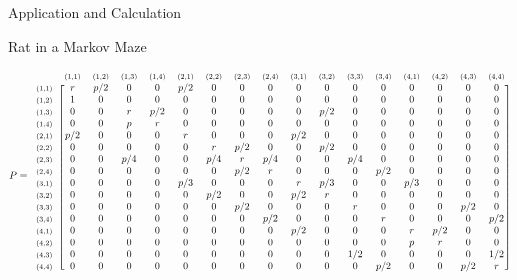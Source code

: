 \documentclass[12pt]{article}
\newcommand{\matindex}[1]{\mbox{\scriptsize#1}}
\newcommand\scalemath[2]{\scalebox{#1}{\mbox{\ensuremath{\displaystyle #2}}}}
\numberwithin{equation}{section}
\begin{document}
\begin{section}{Application and Calculation}
\begin{subsection}{Rat in a Markov Maze}
\begin{enumerate}
            \[\scalemath{0.75}{P=\begin{blockarray}{ccccccccccccccccc}&\matindex{(1,1)}&\matindex{(1,2)}&\matindex{(1,3)}&\matindex{(1,4)}&\matindex{(2,1)}&\matindex{(2,2)}&\matindex{(2,3)}&\matindex{(2,4)}&\matindex{(3,1)}&\matindex{(3,2)}&\matindex{(3,3)}&\matindex{(3,4)}&\matindex{(4,1)}&\matindex{(4,2)}&\matindex{(4,3)}&\matindex{(4,4)}\\
        \begin{block}{c[cccccccccccccccc]}\matindex{(1,1)}&r&p/2&0&0&p/2&0&0&0&0&0&0&0&0&0&0&0\\
        \matindex{(1,2)}&1&0&0&0&0&0&0&0&0&0&0&0&0&0&0&0\\
        \matindex{(1,3)}&0&0&r&p/2&0&0&0&0&0&p/2&0&0&0&0&0&0\\
        \matindex{(1,4)}&0&0&p&r&0&0&0&0&0&0&0&0&0&0&0&0\\
        \matindex{(2,1)}&p/2&0&0&0&r&0&0&0&p/2&0&0&0&0&0&0&0\\
        \matindex{(2,2)}&0&0&0&0&0&r&p/2&0&0&p/2&0&0&0&0&0&0\\
        \matindex{(2,3)}&0&0&p/4&0&0&p/4&r&p/4&0&0&p/4&0&0&0&0&0\\
        \matindex{(2,4)}&0&0&0&0&0&0&p/2&r&0&0&0&p/2&0&0&0&0\\
        \matindex{(3,1)}&0&0&0&0&p/3&0&0&0&r&p/3&0&0&p/3&0&0&0\\
        \matindex{(3,2)}&0&0&0&0&0&p/2&0&0&p/2&r&0&0&0&0&0&0\\
        \matindex{(3,3)}&0&0&0&0&0&0&p/2&0&0&0&r&0&0&0&p/2&0\\
        \matindex{(3,4)}&0&0&0&0&0&0&0&p/2&0&0&0&r&0&0&0&p/2\\
        \matindex{(4,1)}&0&0&0&0&0&0&0&0&p/2&0&0&0&r&p/2&0&0\\
        \matindex{(4,2)}&0&0&0&0&0&0&0&0&0&0&0&0&p&r&0&0\\
        \matindex{(4,3)}&0&0&0&0&0&0&0&0&0&0&1/2&0&0&0&0&1/2\\
        \matindex{(4,4)}&0&0&0&0&0&0&0&0&0&0&0&p/2&0&0&p/2&r\\
        \end{block}
        \end{blockarray}}\]


\end{enumerate}
\end{subsection}
\end{section}
\end{document}
